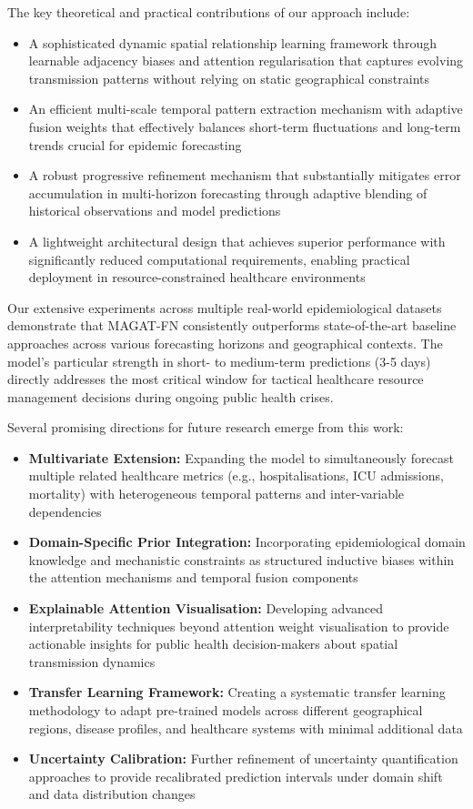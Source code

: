 \documentclass[lettersize, journal]{IEEEtran}
\begin{document}
The key theoretical and practical contributions of our approach include:
\begin{itemize}
    \item A sophisticated dynamic spatial relationship learning framework through learnable adjacency biases and attention regularisation that captures evolving transmission patterns without relying on static geographical constraints
    \item An efficient multi-scale temporal pattern extraction mechanism with adaptive fusion weights that effectively balances short-term fluctuations and long-term trends crucial for epidemic forecasting
    \item A robust progressive refinement mechanism that substantially mitigates error accumulation in multi-horizon forecasting through adaptive blending of historical observations and model predictions
    \item A lightweight architectural design that achieves superior performance with significantly reduced computational requirements, enabling practical deployment in resource-constrained healthcare environments
\end{itemize}

Our extensive experiments across multiple real-world epidemiological datasets demonstrate that MAGAT-FN consistently outperforms state-of-the-art baseline approaches across various forecasting horizons and geographical contexts. The model's particular strength in short- to medium-term predictions (3-5 days) directly addresses the most critical window for tactical healthcare resource management decisions during ongoing public health crises.

Several promising directions for future research emerge from this work:
\begin{itemize}
    \item \textbf{Multivariate Extension:} Expanding the model to simultaneously forecast multiple related healthcare metrics (e.g., hospitalisations, ICU admissions, mortality) with heterogeneous temporal patterns and inter-variable dependencies
    \item \textbf{Domain-Specific Prior Integration:} Incorporating epidemiological domain knowledge and mechanistic constraints as structured inductive biases within the attention mechanisms and temporal fusion components
    \item \textbf{Explainable Attention Visualisation:} Developing advanced interpretability techniques beyond attention weight visualisation to provide actionable insights for public health decision-makers about spatial transmission dynamics
    \item \textbf{Transfer Learning Framework:} Creating a systematic transfer learning methodology to adapt pre-trained models across different geographical regions, disease profiles, and healthcare systems with minimal additional data
    \item \textbf{Uncertainty Calibration:} Further refinement of uncertainty quantification approaches to provide recalibrated prediction intervals under domain shift and data distribution changes
\end{itemize}
\end{document}
